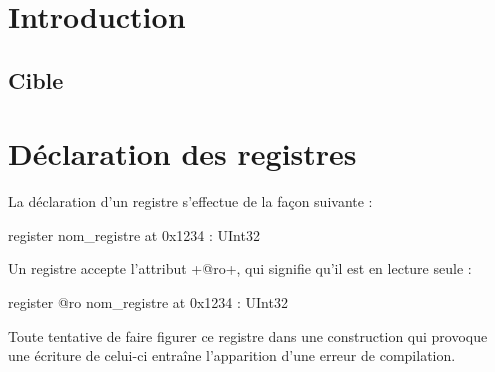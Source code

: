 

\chapter{Introduction}

\thispagestyle{empty}



\section{Cible}




\chapter{Déclaration des registres}


La déclaration d'un registre s'effectue de la façon suivante :
\begin{PLM}
register nom_registre at 0x1234 : UInt32
\end{PLM}

Un registre accepte l'attribut \plm+@ro+, qui signifie qu'il est en lecture seule :
\begin{PLM}
register @ro nom_registre at 0x1234 : UInt32
\end{PLM}

Toute tentative de faire figurer ce registre dans une construction qui provoque une écriture de celui-ci entraîne l'apparition d'une erreur de compilation.
